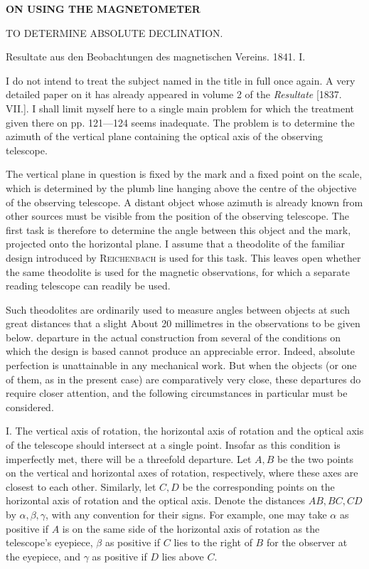 \clearpage
{}
\begin{center}
{\Large\bfseries ON USING THE MAGNETOMETER\par\medskip TO DETERMINE ABSOLUTE DECLINATION.}
\par\bigskip
Resultate aus den Beobachtungen des magnetischen Vereins. 1841. I.
\end{center}
I do not intend to treat the subject named in the title in full once again. A very detailed paper on it has already appeared in volume 2 of the \textit{Resultate} [1837. VII.]. I shall limit myself here to a single main problem for which the treatment given there on pp. 121—124 seems inadequate. The problem is to determine the azimuth of the vertical plane containing the optical axis of the observing telescope.

The vertical plane in question is fixed by the mark and a fixed point on the scale, which is determined by the plumb line hanging above the centre of the objective of the observing telescope. A distant object whose azimuth is already known from other sources must be visible from the position of the observing telescope. The first task is therefore to determine the angle between this object and the mark, projected onto the horizontal plane. I assume that a theodolite of the familiar design introduced by \textsc{Reichenbach} is used for this task. This leaves open whether the same theodolite is used for the magnetic observations, for which a separate reading telescope can readily be used.

Such theodolites are ordinarily used to measure an\-gles between objects at such great distances that a slight
\expandafter\def\csname HistoricalNoteText443\endcsname{About 20 millimetres in the observations to be given below.}%
departure in the actual construction from several of the conditions on which the design is based cannot produce an appreciable error. Indeed, absolute perfection is unattainable in any mechanical work. But when the objects (or one of them, as in the present case) are comparatively very close, these departures do require closer attention, and the following circumstances in particular must be considered.

I. The vertical axis of rotation, the horizontal axis of rotation and the optical axis of the telescope should intersect at a single point. Insofar as this condition is imperfectly met, there will be a threefold departure. Let $A,B$ be the two points on the vertical and horizontal axes of rotation, respectively, where these axes are closest to each other. Similarly, let $C,D$ be the corresponding points on the horizontal axis of rotation and the optical axis. Denote the distances $AB,BC,CD$ by $\alpha,\beta,\gamma$, with any convention for their signs. For example, one may take $\alpha$ as positive if $A$ is on the same side of the horizontal axis of rotation as the telescope’s eyepiece, $\beta$ as positive if $C$ lies to the right of $B$ for the observer at the eyepiece, and $\gamma$ as positive if $D$ lies above $C$.

